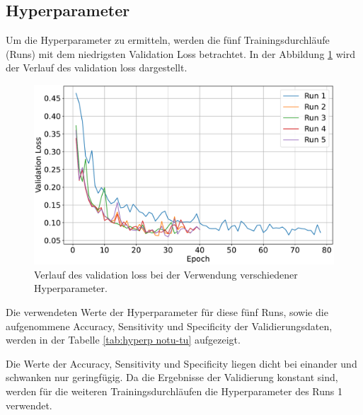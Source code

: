 \subsection{Hyperparameter}
Um die Hyperparameter zu ermitteln, werden die fünf Trainingsdurchläufe (Runs) mit dem niedrigsten Validation Loss betrachtet.
In der Abbildung \ref{fig:val_loss notu-tu} wird der Verlauf des validation loss dargestellt.
\begin{figure}[H]
  \centering
  \includegraphics[scale=0.3]{plots/Val_loss_noTu_Tu.pdf}
  \caption{Verlauf des validation loss bei der Verwendung verschiedener Hyperparameter.}
  \label{fig:val_loss notu-tu}
\end{figure}
\vspace{-2em}
Die verwendeten Werte der Hyperparameter für diese fünf Runs, sowie die aufgenommene Accuracy, Sensitivity und Specificity der Validierungsdaten,
werden in der Tabelle \ref{tab:hyperp notu-tu} aufgezeigt.
\begin{table}[H]
    \centering
  \caption{Die fünf Runs mit dem niedrigsten validation loss sowie deren verwendete Hyperparameter und aufgezeichnete Metriken.}
  \label{tab:hyperp notu-tu}
\end{table}
Die Werte der Accuracy, Sensitivity und Specificity liegen dicht bei einander und schwanken nur geringfügig.
Da die Ergebnisse der Validierung konstant sind, werden für die weiteren Trainingsdurchläufen die Hyperparameter des Runs 1 verwendet. 

